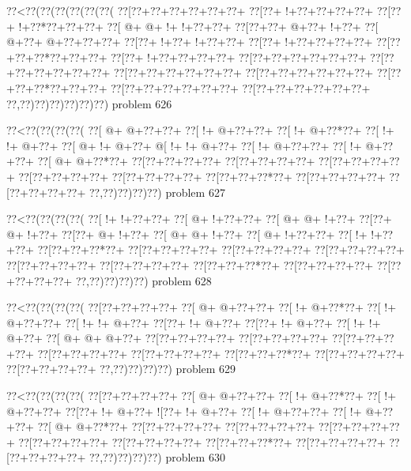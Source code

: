 \vbox{\vbox{\goo
\0??<\0??(\0??(\0??(\0??(\0??(\0??(
\0??[\0??+\0??+\0??+\0??+\0??+\0??+
\0??[\0??+\- !+\0??+\0??+\0??+\0??+
\0??[\0??+\- !+\0??*\0??+\0??+\0??+
\0??[\- @+\- @+\- !+\- !+\0??+\0??+
\0??[\0??+\0??+\- @+\0??+\- !+\0??+
\0??[\- @+\0??+\- @+\0??+\0??+\0??+
\0??[\0??+\- !+\0??+\- !+\0??+\0??+
\0??[\0??+\- !+\0??+\0??+\0??+\0??+
\0??[\0??+\0??+\0??*\0??+\0??+\0??+
\0??[\0??+\- !+\0??+\0??+\0??+\0??+
\0??[\0??+\0??+\0??+\0??+\0??+\0??+
\0??[\0??+\0??+\0??+\0??+\0??+\0??+
\0??[\0??+\0??+\0??+\0??+\0??+\0??+
\0??[\0??+\0??+\0??+\0??+\0??+\0??+
\0??[\0??+\0??+\0??*\0??+\0??+\0??+
\0??[\0??+\0??+\0??+\0??+\0??+\0??+
\0??[\0??+\0??+\0??+\0??+\0??+\0??+
\0??,\0??)\0??)\0??)\0??)\0??)\0??)
}
\hfil problem 626\hfil\break
}

\vbox{\vbox{\goo
\0??<\0??(\0??(\0??(\0??(
\0??[\- @+\- @+\0??+\0??+
\0??[\- !+\- @+\0??+\0??+
\0??[\- !+\- @+\0??*\0??+
\0??[\- !+\- !+\- @+\0??+
\0??[\- @+\- !+\- @+\0??+
\- @[\- !+\- !+\- @+\0??+
\0??[\- !+\- @+\0??+\0??+
\0??[\- !+\- @+\0??+\0??+
\0??[\- @+\- @+\0??*\0??+
\0??[\0??+\0??+\0??+\0??+
\0??[\0??+\0??+\0??+\0??+
\0??[\0??+\0??+\0??+\0??+
\0??[\0??+\0??+\0??+\0??+
\0??[\0??+\0??+\0??+\0??+
\0??[\0??+\0??+\0??*\0??+
\0??[\0??+\0??+\0??+\0??+
\0??[\0??+\0??+\0??+\0??+
\0??,\0??)\0??)\0??)\0??)
}
\hfil problem 627\hfil\break
}

\vbox{\vbox{\goo
\0??<\0??(\0??(\0??(\0??(
\0??[\- !+\- !+\0??+\0??+
\0??[\- @+\- !+\0??+\0??+
\0??[\- @+\- @+\- !+\0??+
\0??[\0??+\- @+\- !+\0??+
\0??[\0??+\- @+\- !+\0??+
\0??[\- @+\- @+\- !+\0??+
\0??[\- @+\- !+\0??+\0??+
\0??[\- !+\- !+\0??+\0??+
\0??[\0??+\0??+\0??*\0??+
\0??[\0??+\0??+\0??+\0??+
\0??[\0??+\0??+\0??+\0??+
\0??[\0??+\0??+\0??+\0??+
\0??[\0??+\0??+\0??+\0??+
\0??[\0??+\0??+\0??+\0??+
\0??[\0??+\0??+\0??*\0??+
\0??[\0??+\0??+\0??+\0??+
\0??[\0??+\0??+\0??+\0??+
\0??,\0??)\0??)\0??)\0??)
}
\hfil problem 628\hfil\break
}

\vbox{\vbox{\goo
\0??<\0??(\0??(\0??(\0??(
\0??[\0??+\0??+\0??+\0??+
\0??[\- @+\- @+\0??+\0??+
\0??[\- !+\- @+\0??*\0??+
\0??[\- !+\- @+\0??+\0??+
\0??[\- !+\- !+\- @+\0??+
\0??[\0??+\- !+\- @+\0??+
\0??[\0??+\- !+\- @+\0??+
\0??[\- !+\- !+\- @+\0??+
\0??[\- @+\- @+\- @+\0??+
\0??[\0??+\0??+\0??+\0??+
\0??[\0??+\0??+\0??+\0??+
\0??[\0??+\0??+\0??+\0??+
\0??[\0??+\0??+\0??+\0??+
\0??[\0??+\0??+\0??+\0??+
\0??[\0??+\0??+\0??*\0??+
\0??[\0??+\0??+\0??+\0??+
\0??[\0??+\0??+\0??+\0??+
\0??,\0??)\0??)\0??)\0??)
}
\hfil problem 629\hfil\break
}

\vbox{\vbox{\goo
\0??<\0??(\0??(\0??(\0??(
\0??[\0??+\0??+\0??+\0??+
\0??[\- @+\- @+\0??+\0??+
\0??[\- !+\- @+\0??*\0??+
\0??[\- !+\- @+\0??+\0??+
\0??[\0??+\- !+\- @+\0??+
\- ![\0??+\- !+\- @+\0??+
\0??[\- !+\- @+\0??+\0??+
\0??[\- !+\- @+\0??+\0??+
\0??[\- @+\- @+\0??*\0??+
\0??[\0??+\0??+\0??+\0??+
\0??[\0??+\0??+\0??+\0??+
\0??[\0??+\0??+\0??+\0??+
\0??[\0??+\0??+\0??+\0??+
\0??[\0??+\0??+\0??+\0??+
\0??[\0??+\0??+\0??*\0??+
\0??[\0??+\0??+\0??+\0??+
\0??[\0??+\0??+\0??+\0??+
\0??,\0??)\0??)\0??)\0??)
}
\hfil problem 630\hfil\break
}

